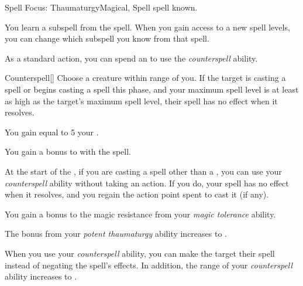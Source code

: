     \begin{feat}{Spell Focus: Thaumaturgy}{Magical, Spell}
        \featpre {} spell known.

         You learn a subspell from the  spell.
        When you gain access to a new spell levels, you can change which subspell you know from that spell.

         As a standard action, you can spend an  to use the \textit{counterspell} ability.
        \begin{ability}{Counterspell}[]
            Choose a creature within \rngmed range of you.
            If the target is casting a spell or begins casting a spell this phase, and your maximum spell level is at least as high as the target's maximum spell level, their spell has no effect when it resolves.
        \end{ability}

         You gain  equal to 5 \add your .

         You gain a  bonus to  with the  spell. 

         At the start of the , if you are casting a spell other than a , you can use your \textit{counterspell} ability without taking an action.
        If you do, your spell has no effect when it resolves, and you regain the action point spent to cast it (if any).

         You gain a  bonus to the magic resistance from your \textit{magic tolerance} ability.

         The bonus from your \textit{potent thaumaturgy} ability increases to .

         When you use your \textit{counterspell} ability, you can make the target  their spell instead of negating the spell's effects.
        In addition, the range of your \textit{counterspell} ability increases to \rnglong.
    \end{feat}

